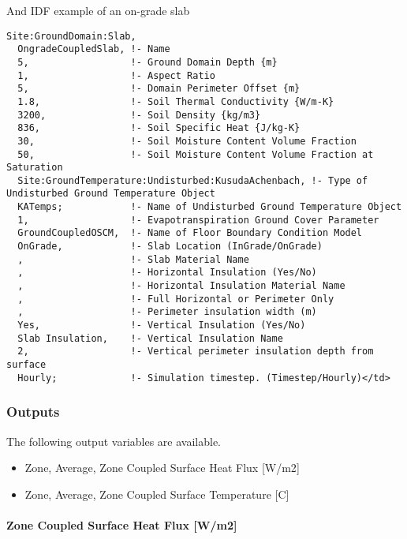 And IDF example of an on-grade slab

\begin{lstlisting}
Site:GroundDomain:Slab,
  OngradeCoupledSlab, !- Name
  5,                  !- Ground Domain Depth {m}
  1,                  !- Aspect Ratio
  5,                  !- Domain Perimeter Offset {m}
  1.8,                !- Soil Thermal Conductivity {W/m-K}
  3200,               !- Soil Density {kg/m3}
  836,                !- Soil Specific Heat {J/kg-K}
  30,                 !- Soil Moisture Content Volume Fraction
  50,                 !- Soil Moisture Content Volume Fraction at Saturation
  Site:GroundTemperature:Undisturbed:KusudaAchenbach, !- Type of Undisturbed Ground Temperature Object
  KATemps;            !- Name of Undisturbed Ground Temperature Object
  1,                  !- Evapotranspiration Ground Cover Parameter
  GroundCoupledOSCM,  !- Name of Floor Boundary Condition Model
  OnGrade,            !- Slab Location (InGrade/OnGrade)
  ,                   !- Slab Material Name
  ,                   !- Horizontal Insulation (Yes/No)
  ,                   !- Horizontal Insulation Material Name
  ,                   !- Full Horizontal or Perimeter Only
  ,                   !- Perimeter insulation width (m)
  Yes,                !- Vertical Insulation (Yes/No)
  Slab Insulation,    !- Vertical Insulation Name
  2,                  !- Vertical perimeter insulation depth from surface
  Hourly;             !- Simulation timestep. (Timestep/Hourly)</td>
\end{lstlisting}

\subsubsection{Outputs}\label{outputs-1-015}

The following output variables are available.

\begin{itemize}
\tightlist
\item
  Zone, Average, Zone Coupled Surface Heat Flux {[}W/m2{]}
\item
  Zone, Average, Zone Coupled Surface Temperature {[}C{]}
\end{itemize}

\paragraph{Zone Coupled Surface Heat Flux {[}W/m2{]}}\label{zone-coupled-surface-heat-flux-wm2}


